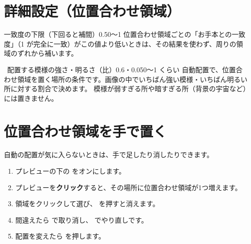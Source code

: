 \section{詳細設定（位置合わせ領域）}


\begin{setting}{ 一致度の下限（下回ると補間）}{0.5}{0〜1}
  位置合わせ領域ごとの「お手本との一致度」（1 が完全に一致）がこの値より低いときは、その結果を使わず、周りの領域のずれから補います。
\end{setting}

\begin{setting}{\, 配置する模様の強さ・明るさ（比）}{0.6・0.05}{0〜1 くらい}
  自動配置で、位置合わせ領域を置く場所の条件です。画像の中でいちばん強い模様・いちばん明るい所に対する割合で決めます。
  模様が弱すぎる所や暗すぎる所（背景の宇宙など）には置きません。
\end{setting}

\section{位置合わせ領域を手で置く}\label{sec:apedit}

自動の配置が気に入らないときは、手で足したり消したりできます。

\begin{enumerate}[itemsep=2pt]
  \item プレビューの下の  をオンにします。
  \item プレビューを\textbf{クリック}すると、その場所に位置合わせ領域が1つ増えます。
  \item 領域をクリックして選び、 を押すと消えます。
  \item 間違えたら  で取り消し、 でやり直しです。
  \item 配置を変えたら  を押します。
\end{enumerate}

